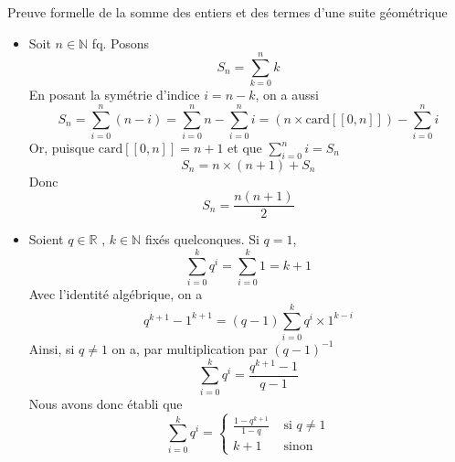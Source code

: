 \documentclass{article}
\date{17 avril 2024}
\begin{document}
\maketitle


\begin{question_kholle}{Preuve formelle de la somme des entiers et des termes d'une suite géométrique} 
    \begin{itemize}[label=$\lozenge$]
        \item Soit $n \in \mathbb{N}$ fq. Posons $$S_{n} = \sum_{k=0}^{n}k$$
        En posant la symétrie d'indice $i = n-k$, on a aussi
        $$
        S_{n}= \sum_{i=0}^{n}(n-i)=\sum_{i=0}^{n}n - \sum_{i=0}^{n}i=(n \times \mathrm{card}[ \! [ 0, n ] \!]) - \sum_{i=0}^{n} i
        $$
        Or, puisque $\mathrm{card}[ \! [ 0, n ] \!] = n + 1$ et que $\sum_{i=0}^{n} i = S_{n}$
        $$
        S_{n} = n \times (n+1) + S_{n}
        $$
        Donc
        $$
        S_{n} = \frac{n(n+1)}{2}
        $$
        \item Soient $q \in \mathbb{R}$ , $k \in \mathbb{N}$ fixés quelconques.
        Si $q = 1$, 
        $$
        \sum_{i=0}^{k}q^{i} = \sum_{i=0}^{k}1 = k+1
        $$
        Avec l'identité algébrique, on a
        $$
        q^{k+1}-1^{k+1} = (q-1) \sum_{i=0}^{k}q^{i}\times 1^{k-i}
        $$
        Ainsi, si $q \neq 1$ on a, par multiplication par $(q-1)^{-1}$
        $$
        \sum_{i=0}^{k}q^{i} = \frac{q^{k+1}-1}{q-1}
        $$
        Nous avons donc établi que
        $$
        \sum_{i=0}^{k} q^{i} = \left\{ \begin{array}{ll}
            \frac{1-q^{k+1}}{1-q}  &\text{ si } q \neq 1 \\
            k + 1 &\text{ sinon}
        \end{array}\right.
        $$
    \end{itemize}
\end{question_kholle}
\end{document}
